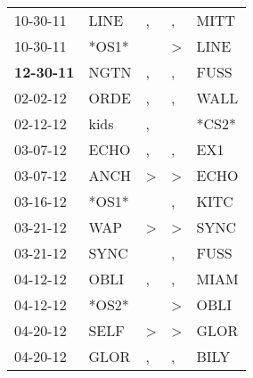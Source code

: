 \begin{supertabular}{p{0.07\textwidth}p{0.06\textwidth}p{0.02\textwidth}p{0.02\textwidth}p{0.06\textwidth}}
          10-30-11\textsuperscript{} &           LINE\textsuperscript{} &                , &                , &           MITT\textsuperscript{} \\
          10-30-11\textsuperscript{} &                            *OS1* &                  &     \textgreater &           LINE\textsuperscript{} \\
 \textbf{12-30-11\textsuperscript{}} &           NGTN\textsuperscript{} &                , &                , &           FUSS\textsuperscript{} \\
          02-02-12\textsuperscript{} &           ORDE\textsuperscript{} &                , &                , &           WALL\textsuperscript{} \\
          02-12-12\textsuperscript{} &           kids\textsuperscript{} &                , &                  &                            *CS2* \\
          03-07-12\textsuperscript{} &           ECHO\textsuperscript{} &                , &                , &            EX1\textsuperscript{} \\
          03-07-12\textsuperscript{} &           ANCH\textsuperscript{} &     \textgreater &     \textgreater &           ECHO\textsuperscript{} \\
          03-16-12\textsuperscript{} &                            *OS1* &                  &                , &           KITC\textsuperscript{} \\
          03-21-12\textsuperscript{} &            WAP\textsuperscript{} &     \textgreater &     \textgreater &           SYNC\textsuperscript{} \\
          03-21-12\textsuperscript{} &           SYNC\textsuperscript{} &                  &                , &           FUSS\textsuperscript{} \\
          04-12-12\textsuperscript{} &           OBLI\textsuperscript{} &                , &                , &           MIAM\textsuperscript{} \\
          04-12-12\textsuperscript{} &                            *OS2* &                  &     \textgreater &           OBLI\textsuperscript{} \\
          04-20-12\textsuperscript{} &           SELF\textsuperscript{} &     \textgreater &     \textgreater &           GLOR\textsuperscript{} \\
          04-20-12\textsuperscript{} &           GLOR\textsuperscript{} &                , &                , &           BILY\textsuperscript{} \\

\end{supertabular}
